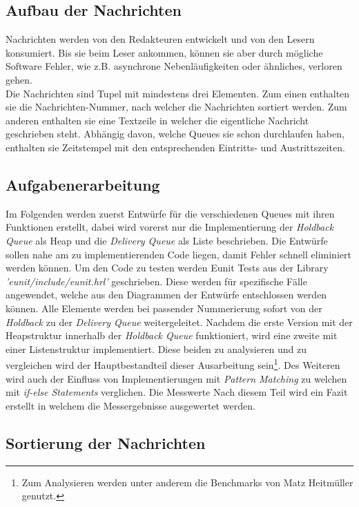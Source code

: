 \subsection{Aufbau der Nachrichten}

Nachrichten werden von den Redakteuren entwickelt und von den Lesern konsumiert. Bis sie beim Leser ankommen, können sie aber durch mögliche Software Fehler, wie z.B. asynchrone Nebenläufigkeiten oder ähnliches, verloren gehen.\\
Die Nachrichten sind Tupel mit mindestens drei Elementen. Zum einen enthalten sie die Nachrichten-Nummer, nach welcher die Nachrichten sortiert werden. Zum anderen enthalten sie eine Textzeile in welcher die eigentliche Nachricht geschrieben steht. Abhängig davon, welche Queues sie schon durchlaufen haben, enthalten sie Zeitstempel mit den entsprechenden Eintritts- und Austrittszeiten. 

\subsection{Aufgabenerarbeitung}

Im Folgenden werden zuerst Entwürfe für die verschiedenen Queues mit ihren Funktionen erstellt, dabei wird vorerst nur die Implementierung der \textit{Holdback Queue} als Heap und die \textit{Delivery Queue} als Liste beschrieben. Die Entwürfe sollen nahe am zu implementierenden Code liegen, damit Fehler schnell eliminiert werden können. Um den Code zu testen werden Eunit Tests aus der Library \textit{'eunit/include/eunit.hrl'} geschrieben. Diese werden für spezifische Fälle angewendet, welche aus den Diagrammen der Entwürfe entschlossen werden können. Alle Elemente werden bei passender Nummerierung sofort von der \textit{Holdback} zu der \textit{Delivery Queue} weitergeleitet.
Nachdem die erste Version mit der Heapstruktur innerhalb der \textit{Holdback Queue} funktioniert, wird eine zweite mit einer Listenstruktur implementiert.
\newpage
Diese beiden zu analysieren und zu vergleichen wird der Hauptbestandteil dieser Ausarbeitung sein\footnote{Zum Analysieren werden unter anderem die Benchmarks von Matz Heitmüller genutzt.}.
Des Weiteren wird auch der Einfluss von Implementierungen mit \textit{Pattern Matching} zu welchen mit \textit{if-else Statements} verglichen. Die Messwerte Nach diesem Teil wird ein Fazit erstellt in welchem die Messergebnisse ausgewertet werden. 

\subsection{Sortierung der Nachrichten} \label{Problemstellungen}

